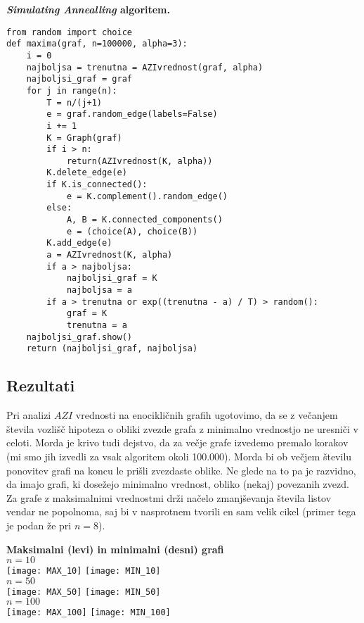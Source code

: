 \documentclass[11pt]{article} %
\begin{document}
\textbf{\textit{Simulating Annealling} algoritem.}
\begin{lstlisting}
from random import choice
def maxima(graf, n=100000, alpha=3):
    i = 0
    najboljsa = trenutna = AZIvrednost(graf, alpha)
    najboljsi_graf = graf
    for j in range(n):
        T = n/(j+1)
        e = graf.random_edge(labels=False)
        i += 1
        K = Graph(graf)
        if i > n:
            return(AZIvrednost(K, alpha))
        K.delete_edge(e)
        if K.is_connected():
            e = K.complement().random_edge()
        else:
            A, B = K.connected_components()
            e = (choice(A), choice(B))
        K.add_edge(e)
        a = AZIvrednost(K, alpha)
        if a > najboljsa:
            najboljsi_graf = K
            najboljsa = a
        if a > trenutna or exp((trenutna - a) / T) > random():
            graf = K
            trenutna = a
    najboljsi_graf.show()
    return (najboljsi_graf, najboljsa)
\end{lstlisting} 

\subsection{Rezultati}

Pri analizi $AZI$ vrednosti na enocikličnih grafih ugotovimo, da se z večanjem števila vozlišč hipoteza o obliki zvezde grafa z minimalno vrednostjo ne uresniči v celoti. Morda je krivo tudi dejstvo, da za večje grafe izvedemo premalo korakov (mi smo jih izvedli za vsak algoritem okoli 100.000). Morda bi ob večjem številu ponovitev grafi na koncu le prišli zvezdaste oblike. Ne glede na to pa je razvidno, da imajo grafi, ki dosežejo minimalno vrednost, obliko (nekaj) povezanih zvezd. Za grafe z maksimalnimi vrednostmi drži načelo zmanjševanja števila listov vendar ne popolnoma, saj bi v nasprotnem tvorili en sam velik cikel (primer tega je podan že pri $n=8$). 

\begin{center}
\textbf{Maksimalni (levi) in minimalni (desni) grafi} \\
\textbf{$n=10$}\\
\texttt{[image: MAX\_10]}
\texttt{[image: MIN\_10]} \\
\textbf{$n=50$}\\
\texttt{[image: MAX\_50]}
\texttt{[image: MIN\_50]} \\
\pagebreak
\textbf{$n=100$}\\
\texttt{[image: MAX\_100]}
\texttt{[image: MIN\_100]} 
\end{center}
\end{document}
